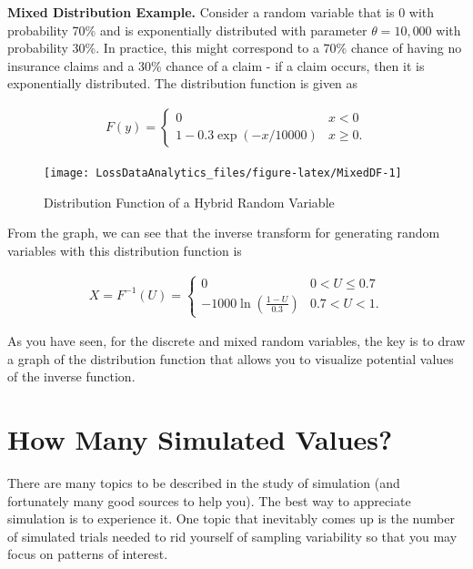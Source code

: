 \documentclass[]{book}
\theoremstyle{definition}
\theoremstyle{definition}
\theoremstyle{definition}
\theoremstyle{remark}
\begin{document}
\textbf{Mixed Distribution Example.} Consider a random variable that is
0 with probability 70\% and is exponentially distributed with parameter
\(\theta= 10,000\) with probability 30\%. In practice, this might
correspond to a 70\% chance of having no insurance claims and a 30\%
chance of a claim - if a claim occurs, then it is exponentially
distributed. The distribution function is given as

\[\begin{aligned}
F(y) = \left\{ \begin{array}{cc}
              0 &  x<0  \\
              1 - 0.3 \exp(-x/10000) & x \ge 0 .
            \end{array} \right.\end{aligned}\]

\begin{figure}

{\centering \texttt{[image: LossDataAnalytics\_files/figure-latex/MixedDF-1]} 

}

\caption{Distribution Function of a Hybrid Random Variable}\label{fig:MixedDF}
\end{figure}

From the graph, we can see that the inverse transform for generating
random variables with this distribution function is

\[\begin{aligned}
X = F^{-1}(U) = \left\{ \begin{array}{cc}
              0 &  0< U  \leq  0.7  \\
              -1000 \ln (\frac{1-U}{0.3}) & 0.7 < U < 1 .
            \end{array} \right.\end{aligned}\]

As you have seen, for the discrete and mixed random variables, the key
is to draw a graph of the distribution function that allows you to
visualize potential values of the inverse function.

\section{How Many Simulated Values?}\label{how-many-simulated-values}

There are many topics to be described in the study of simulation (and
fortunately many good sources to help you). The best way to appreciate
simulation is to experience it. One topic that inevitably comes up is
the number of simulated trials needed to rid yourself of sampling
variability so that you may focus on patterns of interest.
\end{document}
